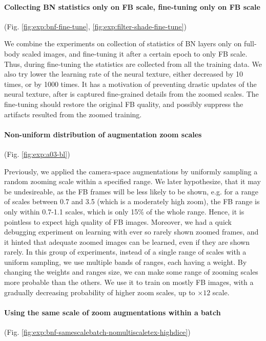 \vspace{-15pt}\paragraph{Collecting BN statistics only on FB scale, fine-tuning only on FB scale}(Fig. \ref{fig:exp:bnf-fine-tune}, \ref{fig:exp:filter-shade-fine-tune})\mbox{}\nopagebreak

We combine the experiments on collection of statistics of BN layers only on full-body scaled images, and fine-tuning it after a certain epoch to only FB scale. Thus, during fine-tuning the statistics are collected from all the training data. We also try lower the learning rate of the neural texture, either decreased by 10 times, or by 1000 times. It has a motivation of preventing drastic updates of the neural texture, after is captured fine-grained details from the zoomed scales. The fine-tuning should restore the original FB quality, and possibly suppress the artifacts resulted from the zoomed training.

\vspace{-15pt}\paragraph{Non-uniform distribution of augmentation zoom scales}(Fig. \ref{fig:exp:a03-bl})\mbox{}\nopagebreak

Previously, we applied the camera-space augmentations by uniformly sampling a random zooming scale within a specified range. We later hypothesize, that it may be undesireable, as the FB frames will be less likely to be shown, e.g. for a range of scales between 0.7 and 3.5 (which is a moderately high zoom), the FB range is only within 0.7-1.1 scales, which is only 15\% of the whole range. Hence, it is pointless to expect high quality of FB images. Moreover, we had a quick debugging experiment on learning with ever so rarely shown zoomed frames, and it hinted that adequate zoomed images can be learned, even if they are shown rarely. In this group of experiments, instead of a single range of scales with a uniform sampling, we use multiple bands of ranges, each having a weight. By changing the weights and ranges size, we can make some range of zooming scales more probable than the others. We use it to train on mostly FB images, with a gradually decreasing probability of higher zoom scales, up to $\times12$ scale.

\vspace{-15pt}\paragraph{Using the same scale of zoom augmentations within a batch}(Fig. \ref{fig:exp:bnf-samescalebatch-nomultiscaletex-highdice})\mbox{}\nopagebreak

